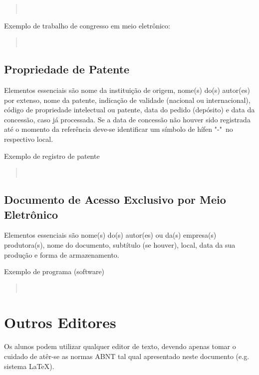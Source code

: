 \documentclass[repeatfields,xlists,xpacks,oneside]{ufrgscca}
\begin{document}
\begin{appendix}
\begin{quote}\noindent{}\\\end{quote}


Exemplo de trabalho de congresso em meio eletrônico:\\

\begin{quote}\noindent{}\\\end{quote}


\section{Propriedade de Patente}

Elementos essenciais são nome da instituição de origem, nome(s) do(s)
autor(es) por extenso, nome da patente, indicação de validade (nacional ou
internacional), código de propriedade intelectual ou patente, data do pedido
(depósito) e data da concessão, caso já processada. Se a data de concessão
não houver sido registrada até o momento da referência deve-se identificar
um símbolo de hífen "-"\ no respectivo local.

Exemplo de registro de patente \\

\begin{quote}\noindent{}\\\end{quote}


\section{Documento de Acesso Exclusivo por Meio Eletrônico}

Elementos essenciais são nome(s) do(s) autor(es) ou da(s) empresa(s)
produtora(s), nome do documento, subtítulo (se houver), local, data da sua
produção e forma de armazenamento.

Exemplo de programa (software)\\

\begin{quote}\noindent{}\\\end{quote}



\chapter{Outros Editores}

Os alunos podem utilizar qualquer editor de texto, devendo apenas tomar o cuidado de atêr-se as normas ABNT tal qual apresentado neste documento (e.g. sistema \LaTeX).

\end{appendix}
\end{document}
